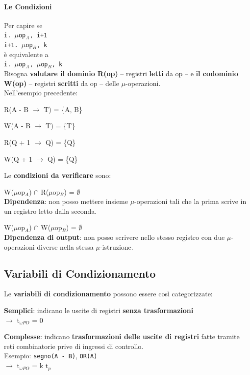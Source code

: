 \documentclass[10pt]{report}
\begin{document}
\paragraph{Le Condizioni} Per capire se\\
\texttt{i. $\mu$op$_A$, i+1\\
i+1. $\mu$op$_B$, k}\\
è equivalente a\\
\texttt{i. $\mu$op$_A$, $\mu$op$_B$, k}\\
Bisogna \textbf{valutare il dominio R(op)} -- registri \textbf{letti} da op -- e \textbf{il codominio W(op)} -- registri \textbf{scritti} da op -- delle $\mu$-operazioni.\\
Nell'esempio precedente:
\begin{list}{}{}
	\item R(A - B $\rightarrow$ T) = \{A, B\}
	\item W(A - B $\rightarrow$ T) = \{T\}
	\item R(Q + 1 $\rightarrow$ Q) = \{Q\}
	\item W(Q + 1 $\rightarrow$ Q) = \{Q\}
\end{list}
Le \textbf{condizioni da verificare} sono:
\begin{list}{}{}
	\item W($\mu$op$_A$) $\cap$ R($\mu$op$_B$) = $\emptyset$\\
	\textbf{Dipendenza}: non posso mettere insieme $\mu$-operazioni tali che la prima scrive in un registro letto dalla seconda.
	\item W($\mu$op$_A$) $\cap$ W($\mu$op$_B$) = $\emptyset$\\
	\textbf{Dipendenza di output}: non posso scrivere nello stesso registro con due $\mu$-operazioni diverse nella stessa $\mu$-istruzione.
\end{list}
\subsection{Variabili di Condizionamento}
Le \textbf{variabili di condizionamento} possono essere così categorizzate:
\begin{list}{}{}
	\item \textbf{Semplici}: indicano le uscite di registri \textbf{senza trasformazioni}\\
	$\longrightarrow$ t$_{\omega PO}$ = 0
	\item \textbf{Complesse}: indicano \textbf{trasformazioni delle uscite di registri} fatte tramite reti combinatorie prive di ingressi di controllo.\\
	Esempio: \texttt{segno(A - B)}, \texttt{OR(A)}\\
	$\longrightarrow$ t$_{\omega PO}$ = k t$_p$
\end{list}
\pagebreak
\end{document}

